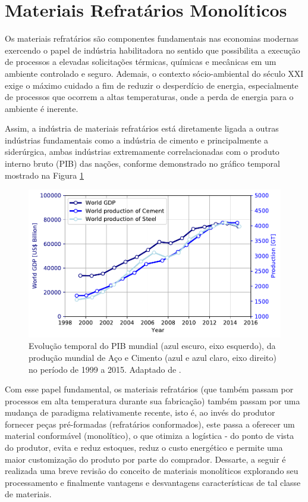 \section{Materiais Refratários Monolíticos}\label{mono}

	Os materiais refratários são componentes fundamentais nas economias modernas exercendo o papel de indústria habilitadora no sentido que possibilita a execução de processos a elevadas solicitações térmicas, químicas e mecânicas em um ambiente controlado e seguro. Ademais, o contexto sócio-ambiental do século XXI exige o máximo cuidado a fim de reduzir o desperdício de energia, especialmente de processos que ocorrem a altas temperaturas, onde a perda de energia para o ambiente é inerente.

	Assim, a indústria de materiais refratários está diretamente ligada a outras indústrias fundamentais como a indústria de cimento e principalmente a siderúrgica, ambas indústrias extremamente correlacionadas com o produto interno bruto (PIB) das nações, conforme demonstrado no gráfico temporal mostrado na Figura \ref{fig:refractory_economy}

\begin{figure}[ht]
\centering
\includegraphics[width=\linewidth]{./figures/refractory_economy.pdf}
\caption{Evolução temporal do PIB mundial (azul escuro, eixo esquerdo), da produção mundial de Aço e Cimento (azul e azul claro, eixo direito) no período de 1999 a 2015.  Adaptado de \cite{GlobalRef2017}. \label{fig:refractory_economy}}
\end{figure}
		Com esse papel fundamental, os materiais refratários (que também passam por processos em alta temperatura durante sua fabricação) também passam por uma mudança de paradigma relativamente recente, isto é, ao invés do produtor fornecer peças pré-formadas (refratários conformados), este passa a oferecer um material conformável (monolítico), o que otimiza a logística - do ponto de vista do produtor, evita e reduz estoques, reduz o custo energético e permite uma maior customização do produto por parte do comprador.
        Dessarte, a seguir é realizada uma breve revisão do conceito de materiais monolíticos explorando seu processamento e finalmente vantagens e desvantagens características de tal classe de materiais.

